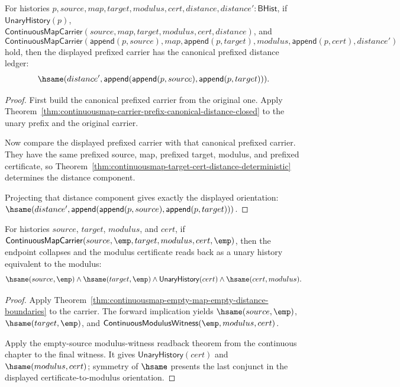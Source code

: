 \begin{theorem}
\label{thm:continuousmap-prefix-canonical-distance-determinacy}
For histories $p,source,map,target,modulus,cert,distance,distance':\mathsf{BHist}$,
if $\mathsf{UnaryHistory}(p)$,
$\mathsf{ContinuousMapCarrier}(source,map,target,modulus,cert,distance)$, and
$$
\mathsf{ContinuousMapCarrier}
(\mathsf{append}(p,source),map,\mathsf{append}(p,target),modulus,
\mathsf{append}(p,cert),distance')
$$
hold, then the displayed prefixed carrier has the canonical prefixed distance
ledger:
$$
\hsame(distance',
\mathsf{append}(\mathsf{append}(p,source),\mathsf{append}(p,target))).
$$
\end{theorem}
\begin{proof}
First build the canonical prefixed carrier from the original one. Apply
Theorem~\ref{thm:continuousmap-carrier-prefix-canonical-distance-closed} to
the unary prefix and the original carrier.

Now compare the displayed prefixed carrier with that canonical prefixed
carrier. They have the same prefixed source, map, prefixed target, modulus, and
prefixed certificate, so
Theorem~\ref{thm:continuousmap-target-cert-distance-deterministic} determines
the distance component.

Projecting that distance component gives exactly the displayed orientation:
$\hsame(distance',
\mathsf{append}(\mathsf{append}(p,source),\mathsf{append}(p,target)))$.
\end{proof}

\begin{theorem}
\label{thm:continuousmap-empty-map-empty-distance-certificate-readback}
For histories $source$, $target$, $modulus$, and $cert$, if
$\mathsf{ContinuousMapCarrier}(source,\emp,target,modulus,cert,\emp)$, then
the endpoint collapses and the modulus certificate reads back as a unary
history equivalent to the modulus:
$$
\hsame(source,\emp)\land\hsame(target,\emp)\land
\mathsf{UnaryHistory}(cert)\land\hsame(cert,modulus).
$$
\end{theorem}
\begin{proof}
Apply Theorem~\ref{thm:continuousmap-empty-map-empty-distance-boundaries} to
the carrier. The forward implication yields $\hsame(source,\emp)$,
$\hsame(target,\emp)$, and
$\mathsf{ContinuousModulusWitness}(\emp,modulus,cert)$.

Apply the empty-source modulus-witness readback theorem from the continuous
chapter to the final witness. It gives $\mathsf{UnaryHistory}(cert)$ and
$\hsame(modulus,cert)$; symmetry of $\hsame$ presents the last conjunct in the
displayed certificate-to-modulus orientation.
\end{proof}


